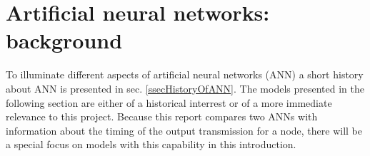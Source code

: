 % 			
% 			
% 			
% 			
% 			
% 			

\section{Artificial neural networks: background}
\label{secANNhistory}
To illuminate different aspects of artificial neural networks (ANN) a short history about ANN is presented in sec. \ref{ssecHistoryOfANN}. 
The models presented in the following section are either of a historical interrest or of a more immediate relevance to this project.
Because this report compares two ANNs with information about the timing of the output transmission for a node, there will be a special focus on models with this capability in this introduction.  %



